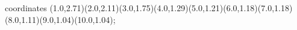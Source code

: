 					coordinates { (1.0,2.71)(2.0,2.11)(3.0,1.75)(4.0,1.29)(5.0,1.21)(6.0,1.18)(7.0,1.18)(8.0,1.11)(9.0,1.04)(10.0,1.04)};
